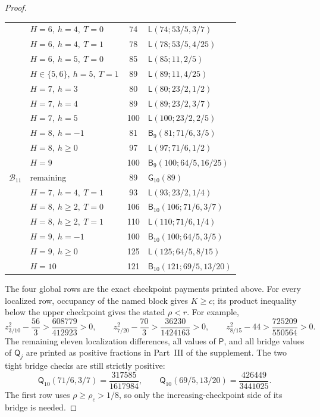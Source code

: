 \documentclass[11pt]{article}
\numberwithin{equation}{section}
\theoremstyle{definition}
\theoremstyle{remark}
\begin{document}
\begin{proof}
\begin{longtable}{@{}c p{5.8cm} c p{5.6cm}@{}}
&\(H=6,\ h=4,\ T=0\)&74&\(\mathsf L(74;53/5,3/7)\)\\
&\(H=6,\ h=4,\ T=1\)&78&\(\mathsf L(78;53/5,4/25)\)\\
&\(H=6,\ h=5,\ T=0\)&85&\(\mathsf L(85;11,2/5)\)\\
&\(H\in\{5,6\},\ h=5,\ T=1\)&89&\(\mathsf L(89;11,4/25)\)\\
&\(H=7,\ h=3\)&80&\(\mathsf L(80;23/2,1/2)\)\\
&\(H=7,\ h=4\)&89&\(\mathsf L(89;23/2,3/7)\)\\
&\(H=7,\ h=5\)&100&\(\mathsf L(100;23/2,2/5)\)\\
&\(H=8,\ h=-1\)&81&\(\mathsf B_9(81;71/6,3/5)\)\\
&\(H=8,\ h\geq0\)&97&\(\mathsf L(97;71/6,1/2)\)\\
&\(H=9\)&100&\(\mathsf B_9(100;64/5,16/25)\)\\
\midrule
\(\mathcal B_{11}\)&remaining&89&\(\mathsf G_{10}(89)\)\\
&\(H=7,\ h=4,\ T=1\)&93&\(\mathsf L(93;23/2,1/4)\)\\
&\(H=8,\ h\geq2,\ T=0\)&106&\(\mathsf B_{10}(106;71/6,3/7)\)\\
&\(H=8,\ h\geq2,\ T=1\)&110&\(\mathsf L(110;71/6,1/4)\)\\
&\(H=9,\ h=-1\)&100&\(\mathsf B_{10}(100;64/5,3/5)\)\\
&\(H=9,\ h\geq0\)&125&\(\mathsf L(125;64/5,8/15)\)\\
&\(H=10\)&121&\(\mathsf B_{10}(121;69/5,13/20)\)\\
\bottomrule
\end{longtable}
\endgroup

The four global rows are the exact checkpoint payments printed above.
For every localized row, occupancy of the named block gives \(K\geq c\);
its product inequality below the upper checkpoint gives the stated
\(\rho<r\).  For example,
\[
 z_{3/10}^2-\frac{56}{3}>
 \frac{608779}{412923}>0,\qquad
 z_{7/20}^2-\frac{70}{3}>
 \frac{36230}{1424163}>0,\qquad
 z_{8/15}^2-44>
 \frac{725209}{550564}>0.
\]
The remaining eleven localization differences, all values of
\(\mathsf P\), and all bridge values of \(\mathsf Q_j\) are printed as
positive fractions in Part~III of the supplement.  The two tight bridge
checks are still strictly positive:
\[
 \mathsf Q_{10}(71/6,3/7)=\frac{317585}{1617984},
 \qquad
 \mathsf Q_{10}(69/5,13/20)=\frac{426449}{3441025}.
\]
The first row uses \(\rho\geq\rho_c>1/8\), so only the increasing-checkpoint
side of its bridge is needed.


\end{proof}
\end{document}
